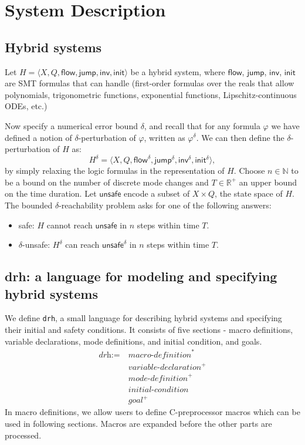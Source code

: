 \section{System Description}

\subsection{Hybrid systems}

Let $H = \langle X, Q, \mathsf{flow}, \mathsf{jump},
\mathsf{inv},\mathsf{init}\rangle$ be a hybrid system, where
$\mathsf{flow}$, $\mathsf{jump}$, $\mathsf{inv}$, $\mathsf{init}$ are
SMT formulas that \dReal{} can handle (first-order formulas over
the reals that allow polynomials, trigonometric functions, exponential
functions, Lipschitz-continuous ODEs, etc.)

Now specify a numerical error bound $\delta$, and recall that for any
formula $\varphi$ we have defined a notion of $\delta$-perturbation of
$\varphi$, written as $\varphi^{\delta}$. We can then define the
$\delta$-perturbation of $H$ as:
\[
H^{\delta} = \langle X, Q, {\mathsf{flow}}^{\delta},
{\mathsf{jump}}^{\delta}, {\mathsf{inv}}^{\delta},
{\mathsf{init}}^{\delta}\rangle,
\]
by simply relaxing the logic formulas in the representation of $H$.
Choose $n\in\mathbb{N}$ to be a bound on the number of discrete mode
changes and $T\in \mathbb{R}^+$ an upper bound on the time duration.
Let $\mathsf{unsafe}$ encode a subset of $X\times Q$, the state space
of $H$. The bounded $\delta$-reachability problem asks for one of the
following answers:

\begin{itemize}
\item  safe: $H$ cannot reach $\mathsf{unsafe}$ in $n$ steps within
  time $T$.
\item $\delta$-unsafe: $H^{\delta}$ can reach ${\mathsf{unsafe}}^{\delta}$ in $n$ steps within time $T$.
\end{itemize}

\subsection{drh: a language for modeling and specifying hybrid systems}

We define \texttt{drh}, a small language for describing hybrid systems
and specifying their initial and safety conditions. It consists of
five sections - macro definitions, variable declarations, mode
definitions, and initial condition, and goals.
\begin{align*}
  \textit{drh} := \ & \textit{macro-definition}^*\\
                  & \textit{variable-declaration}^+\\
                  & \textit{mode-definition}^+\\
                  & \textit{initial-condition}\\
                  & \textit{goal}^+
\end{align*}
In macro definitions, we allow users to define C-preprocessor macros
which can be used in following sections. Macros are expanded before
the other parts are processed.

